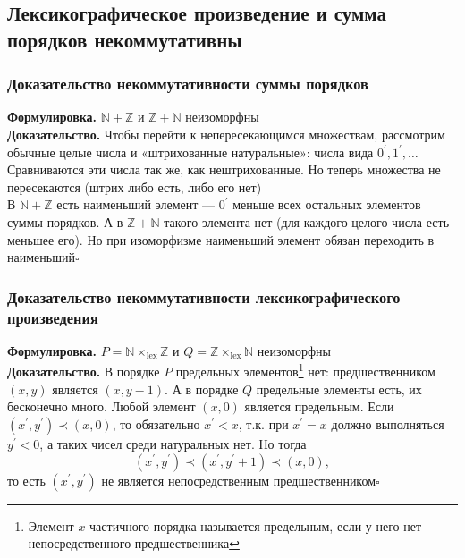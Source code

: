 \documentclass[a4paper]{article}
\newcommand{\qed}{\hfill$\square$}
\begin{document}

\subsection{Лексикографическое произведение и сумма порядков некоммутативны}
\subsubsection*{Доказательство некоммутативности суммы порядков}
\textbf{Формулировка.} $\mathbb{N}+\mathbb{Z}$ и $\mathbb{Z}+\mathbb{N}$ неизоморфны\\[2mm]
\indent\textbf{Доказательство.} Чтобы перейти к непересекающимся множествам, рассмотрим обычные целые числа и «штрихованные натуральные»: числа вида $0^{\prime}, 1^{\prime}, \ldots$ Сравниваются эти числа так же, как нештрихованные. Но теперь множества не пересекаются (штрих либо есть, либо его нет)\\[2mm]
\indent В $\mathbb{N}+\mathbb{Z}$ есть наименьший элемент — $0^{\prime}$ меньше всех остальных элементов суммы порядков. А в $\mathbb{Z}+\mathbb{N}$ такого элемента нет (для каждого целого числа есть меньшее его). Но при изоморфизме наименьший элемент обязан переходить в наименьший\qed

\subsubsection*{Доказательство некоммутативности лексикографического произведения}
\textbf{Формулировка.} $P=\mathbb{N} \times_{\operatorname{lex}} \mathbb{Z}$ и $Q=\mathbb{Z} \times_{\textrm{lex}}\mathbb{N}$ неизоморфны\\[2mm]
\indent\textbf{Доказательство.} В порядке $P$ предельных элементов\footnote{Элемент $x$ частичного порядка называется предельным, если у него нет непосредственного предшественника} нет: предшественником $(x, y)$ является $(x, y-1)$. А в порядке $Q$ предельные элементы есть, их бесконечно много. Любой элемент $(x, 0)$ является предельным. Если $\left(x^{\prime}, y^{\prime}\right) \prec(x, 0)$, то обязательно $x^{\prime}<x$, т.к. при $x^{\prime}=x$ должно выполняться $y^{\prime}<0$, а таких чисел среди натуральных нет. Но тогда
$$\left(x^{\prime}, y^{\prime}\right) \prec\left(x^{\prime}, y^{\prime}+1\right) \prec(x, 0),$$
то есть $\left(x^{\prime}, y^{\prime}\right)$ не является непосредственным предшественником\qed
\end{document}
